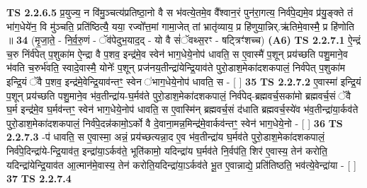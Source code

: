 \documentclass[17pt]{extarticle}
\begin{document}
                                \textbf{ TS 2.2.6.5} \newline
                  प्र॒युज्य॒ न वि॑मु॒ञ्चत्य॑प्रतिष्ठा॒नो वै स भ॑वत्ये॒तमे॒व वै᳚श्वान॒रं पुन॑रा॒गत्य॒ निर्व॑पे॒द्यमे॒व प्र॑यु॒ङ्क्ते तं भा॑ग॒धेये॑न॒ वि मु॑ञ्चति॒ प्रति॑ष्ठित्यै॒ यया॒ रज्वो᳚त्त॒मां गामा॒जेत् तां भ्रातृ॑व्याय॒ प्र हि॑णुया॒न्निर्.ऋ॑तिमे॒वास्मै॒ प्र हि॑णोति ॥ \textbf{  34 } \newline
                  \newline
                      (मृ॒जा॒ते॒ - नि॒र्व॒रु॒णं - ॅव॑पेदुभ॒याद॒द् - यो वै सं॑ॅवथ्स॒रꣳ - षट्त्रिꣳ॑शच्च)  \textbf{(A6)} \newline \newline
                                        \textbf{ TS 2.2.7.1} \newline
                  ऐ॒न्द्रं च॒रु निंर्व॑पेत् प॒शुका॑म ऐ॒न्द्रा वै प॒शव॒ इन्द्र॑मे॒व स्वेन॑ भाग॒धेये॒नोप॑ धावति॒ स ए॒वास्मै॑ प॒शून् प्रय॑च्छति पशु॒माने॒व भ॑वति च॒रुर्भ॑वति॒ स्वादे॒वास्मै॒ योनेः᳚ प॒शून् प्रज॑नय॒तीन्द्रा॑येन्द्रि॒याव॑ते पुरो॒डाश॒मेका॑दशकपालं॒ निर्व॑पेत् प॒शुका॑म इन्द्रि॒यं ॅवै प॒शव॒ इन्द्र॑मे॒वेन्द्रि॒याव॑न्तꣳ॒॒ स्वेन ॑भाग॒धेये॒नोप॑ धावति॒ स - [  ] \textbf{  35} \newline
                  \newline
                                \textbf{ TS 2.2.7.2} \newline
                  ए॒वास्मा॑ इन्द्रि॒यं प॒शून् प्रय॑च्छति पशु॒माने॒व भ॑व॒तीन्द्रा॑य-घ॒र्मव॑ते पुरो॒डाश॒मेका॑दशकपालं॒ निर्व॑पेद्-ब्रह्मवर्च॒सका॑मो ब्रह्मवर्च॒सं ॅवै घ॒र्म इन्द्र॑मे॒व घ॒र्मव॑न्तꣳ॒॒ स्वेन॑ भाग॒धेये॒नोप॑ धावति॒ स ए॒वास्मि॑न् ब्रह्मवर्च॒सं द॑धाति ब्रह्मवर्च॒स्ये॑व भ॑व॒तीन्द्रा॑या॒र्कव॑ते पुरो॒डाश॒मेका॑दशकपालं॒ निर्व॑पे॒दन्न॑कामो॒ऽर्को वै दे॒वाना॒मन्न॒मिन्द्र॑मे॒वार्कव॑न्तꣳ॒॒ स्वेन॑ भाग॒धेये॒नो - [  ] \textbf{  36} \newline
                  \newline
                                \textbf{ TS 2.2.7.3} \newline
                  -प॑ धावति॒ स ए॒वास्मा॒ अन्नं॒ प्रय॑च्छत्यन्ना॒द ए॒व भ॑व॒तीन्द्रा॑य घ॒र्मव॑ते पुरो॒डाश॒मेका॑दशकपालं॒ निर्व॑पे॒दिन्द्रा॑ये-न्द्रि॒याव॑त॒ इन्द्रा॑या॒ऽर्कव॑ते॒ भूति॑कामो॒ यदिन्द्रा॑य घ॒र्मव॑ते नि॒र्वप॑ति॒ शिर॑ ए॒वास्य॒ तेन॑ करोति॒ यदिन्द्रा॑येन्द्रि॒याव॑त आ॒त्मान॑मे॒वास्य॒ तेन॑ करोति॒यदिन्द्रा॑या॒ऽर्कव॑ते भू॒त ए॒वान्नाद्ये॒ प्रति॑तिष्ठति॒ भव॑त्ये॒वेन्द्रा॑या - [  ] \textbf{  37} \newline
                  \newline
                                \textbf{ TS 2.2.7.4} \newline
\end{document}
